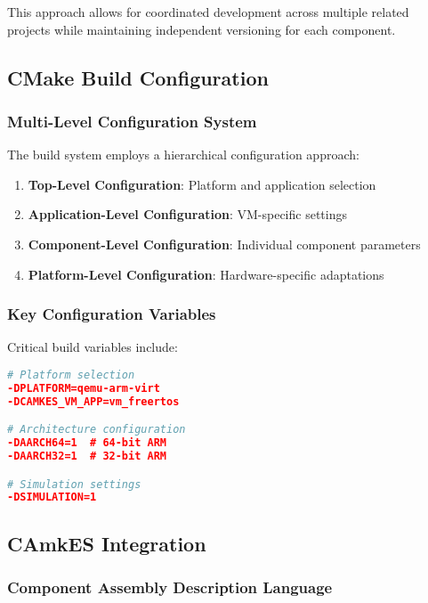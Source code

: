 \documentclass[11pt,a4paper]{article}
\begin{document}
This approach allows for coordinated development across multiple related projects while maintaining independent versioning for each component.

\subsection{CMake Build Configuration}

\subsubsection{Multi-Level Configuration System}

The build system employs a hierarchical configuration approach:

\begin{enumerate}
\item \textbf{Top-Level Configuration}: Platform and application selection
\item \textbf{Application-Level Configuration}: VM-specific settings
\item \textbf{Component-Level Configuration}: Individual component parameters
\item \textbf{Platform-Level Configuration}: Hardware-specific adaptations
\end{enumerate}

\subsubsection{Key Configuration Variables}

Critical build variables include:

\begin{lstlisting}[language=cmake, caption=Build Configuration Variables]
# Platform selection
-DPLATFORM=qemu-arm-virt
-DCAMKES_VM_APP=vm_freertos

# Architecture configuration
-DAARCH64=1  # 64-bit ARM
-DAARCH32=1  # 32-bit ARM

# Simulation settings
-DSIMULATION=1
\end{lstlisting}

\subsection{CAmkES Integration}

\subsubsection{Component Assembly Description Language}
\end{document}

